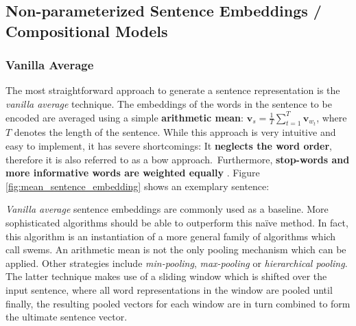 \subsection{Non-parameterized Sentence Embeddings / Compositional Models}
\label{sec:sent_embs_non_param}

\vspace*{-1mm}
\subsubsection{Vanilla Average}
\label{sec:vanilla_average}

The most straightforward approach to generate a sentence representation is the \textit{vanilla average} technique. The embeddings of the words in the sentence to be encoded are averaged using a simple \textbf{arithmetic mean}: $\bm{v}_s = \frac{1}{T} \sum_{t=1}^T \bm{v}_{w_t}$, where $T$ denotes the length of the sentence. While this approach is very intuitive and easy to implement, it has severe shortcomings:  It \textbf{neglects the word order}, therefore it is also referred to as a \gls{bow} approach. \,Furthermore, \textbf{stop-words and more informative words are weighted equally} \citep{Le.2014}. Figure \vref{fig:mean_sentence_embedding} shows an exemplary sentence:



\textit{Vanilla average} sentence embeddings are commonly used as a baseline. More sophisticated algorithms should be able to outperform this na\"{i}ve method. In fact, this algorithm is an instantiation of a more general family of algorithms which \citep{Shen.2018} call \glspl{swem}. An arithmetic mean is not the only pooling mechanism which can be applied. Other strategies include \textit{min-pooling}, \textit{max-pooling} or \textit{hierarchical pooling}. The latter technique makes use of a sliding window which is shifted over the input sentence, where all word representations in the window are pooled until finally, the resulting pooled vectors for each window are in turn combined to form the ultimate sentence vector.

